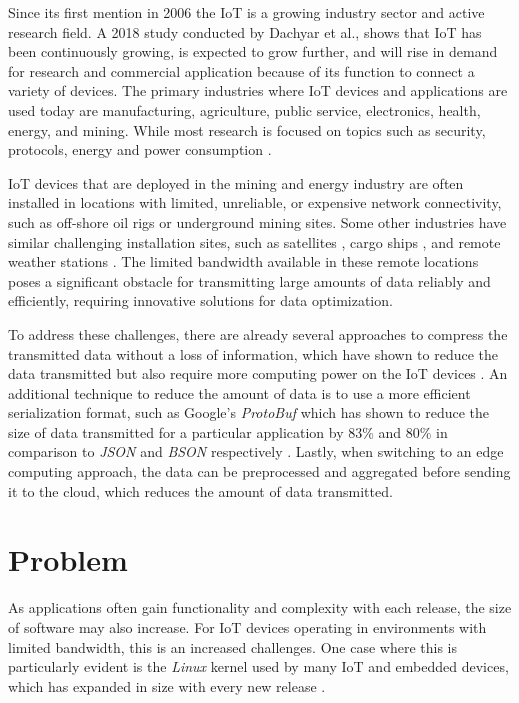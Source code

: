 Since its first mention in 2006 \cite{Adelmann2006ToolkitFB} the \ac{IoT}
is a growing industry sector and active research field. A 2018 study conducted
by Dachyar et al., shows that \ac{IoT} has been continuously growing, is expected
to grow further, and will rise in demand for research and commercial application
because of its function to connect a variety of devices. The primary industries
where \ac{IoT} devices and applications are used today are manufacturing,
agriculture, public service, electronics, health, energy, and mining.
While most research is focused on topics such as security, protocols, energy and
power consumption \cite{dachyar2019knowledge}.

\ac{IoT} devices that are deployed in the mining and energy industry are often
installed in locations with limited, unreliable, or expensive network
connectivity, such as off-shore oil rigs or underground mining sites.
Some other industries have similar challenging installation sites, such as
satellites \cite{electronics8111247}, cargo ships \cite{9090272}, and remote weather stations \cite{info12040146}.
The limited bandwidth available in these remote locations poses a significant
obstacle for transmitting large amounts of data reliably and efficiently,
requiring innovative solutions for data optimization.

To address these challenges, there are already several approaches to compress
the transmitted data without a loss of information, which have shown to reduce
the data transmitted but also require more computing power on the \ac{IoT}
devices \cite{9243457}. An additional technique to reduce the amount of data
is to use a more efficient serialization format, such as Google's \textit{ProtoBuf}
which has shown to reduce the size of data transmitted for a particular application
by 83\% and 80\% in comparison to \textit{JSON} and \textit{BSON} respectively \cite{7765670}.
Lastly, when switching to an edge computing approach, the data can be preprocessed
and aggregated before sending it to the cloud, which reduces the amount of data
transmitted.


\section{Problem}
As applications often gain functionality and complexity with each release, the
size of software may also increase. For \ac{IoT} devices operating in environments
with limited bandwidth, this is an increased challenges. One case where this is
particularly evident is the \textit{Linux} kernel used by many \ac{IoT} and embedded
devices, which has expanded in size with every new release \cite{linux-kernel-report}.

